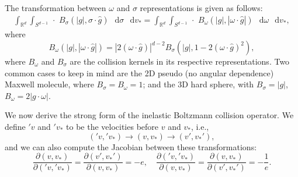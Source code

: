 \documentclass[review, times]{elsarticle}
\newcommand*\diff{\mathop{}\!\mathrm{d}}
\begin{document}
The transformation between $\omega$ and $\sigma$ representations is given as follows:
\begin{align}
\int_{\mathbb{R}^d}\int_{S^{d-1}}\, \cdot  \,\, B_{\sigma}(|g|,\sigma\cdot \hat{g})\,\diff{\sigma}\,\diff{v_*} = \int_{\mathbb{R}^d}\int_{S^{d-1}}\, \cdot  \,\, B_{\omega}(|g|, |\omega\cdot \hat{g}|)\,\diff{\omega}\,\diff{v_*},
\end{align}
where
\begin{equation}
B_{\omega}(|g|, |\omega\cdot \hat{g}|)=|2(\omega\cdot \hat{g})|^{d-2}B_{\sigma}(|g|,1-2(\omega\cdot\hat{g})^2),
\end{equation}
where $B_\omega$ and $B_\sigma$ are the collision kernels in its respective representations. Two common cases to keep in mind are the 2D pseudo (no angular dependence) Maxwell molecule, where $B_{\sigma}=B_{\omega}=1$; and the 3D hard sphere, with $B_{\sigma}=|g|$, $B_{\omega}=2|g\cdot\omega|$.


We now derive the strong form of the inelastic Boltzmann collision operator. We define $'v$ and $'v_*$ to be the velocities before $v$ and $v_*$, i.e.,
\begin{equation}
('v,'v_*) \rightarrow (v,v_*) \rightarrow (v',v_*'),
\end{equation}
and we can also compute the Jacobian between these transformations:
\begin{equation}
\frac{\partial(v,v_*)}{\partial ('v,'v_*)}=\frac{\partial(v',v_*')}{\partial (v,v_*)}=-e, \quad \frac{\partial ('v,'v_*)}{\partial(v,v_*)}=\frac{\partial (v,v_*)}{\partial(v',v_*')}=-\frac{1}{e}.
\end{equation}
\end{document}
